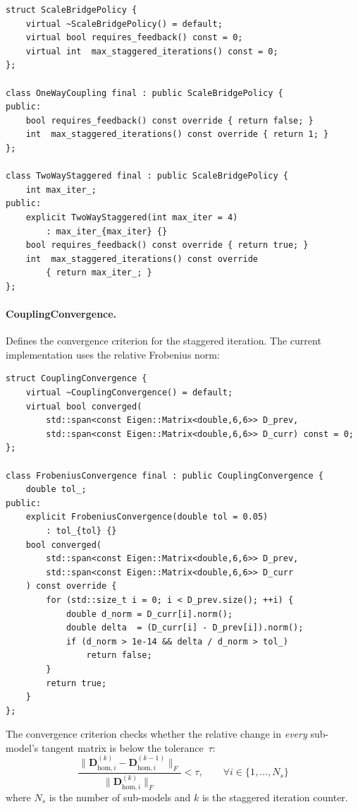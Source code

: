 \begin{lstlisting}[caption={Scale bridge policy ABC and concrete implementations.},
                   label={lst:scale-bridge}]
struct ScaleBridgePolicy {
    virtual ~ScaleBridgePolicy() = default;
    virtual bool requires_feedback() const = 0;
    virtual int  max_staggered_iterations() const = 0;
};

class OneWayCoupling final : public ScaleBridgePolicy {
public:
    bool requires_feedback() const override { return false; }
    int  max_staggered_iterations() const override { return 1; }
};

class TwoWayStaggered final : public ScaleBridgePolicy {
    int max_iter_;
public:
    explicit TwoWayStaggered(int max_iter = 4)
        : max_iter_{max_iter} {}
    bool requires_feedback() const override { return true; }
    int  max_staggered_iterations() const override
        { return max_iter_; }
};
\end{lstlisting}

\paragraph{CouplingConvergence.}
Defines the convergence criterion for the staggered iteration.
The current implementation uses the relative Frobenius norm:

\begin{lstlisting}[caption={Frobenius convergence criterion.},
                   label={lst:frobenius-conv}]
struct CouplingConvergence {
    virtual ~CouplingConvergence() = default;
    virtual bool converged(
        std::span<const Eigen::Matrix<double,6,6>> D_prev,
        std::span<const Eigen::Matrix<double,6,6>> D_curr) const = 0;
};

class FrobeniusConvergence final : public CouplingConvergence {
    double tol_;
public:
    explicit FrobeniusConvergence(double tol = 0.05)
        : tol_{tol} {}
    bool converged(
        std::span<const Eigen::Matrix<double,6,6>> D_prev,
        std::span<const Eigen::Matrix<double,6,6>> D_curr
    ) const override {
        for (std::size_t i = 0; i < D_prev.size(); ++i) {
            double d_norm = D_curr[i].norm();
            double delta  = (D_curr[i] - D_prev[i]).norm();
            if (d_norm > 1e-14 && delta / d_norm > tol_)
                return false;
        }
        return true;
    }
};
\end{lstlisting}

The convergence criterion checks whether the relative change in \emph{every}
sub-model's tangent matrix is below the tolerance~$\tau$:
\begin{equation}
  \frac{\bigl\lVert \mathbf{D}_{\mathrm{hom},i}^{(k)}
        - \mathbf{D}_{\mathrm{hom},i}^{(k-1)} \bigr\rVert_F}
       {\bigl\lVert \mathbf{D}_{\mathrm{hom},i}^{(k)} \bigr\rVert_F}
  < \tau, \qquad \forall i \in \{1,\ldots,N_s\}
  \label{eq:frobenius-conv}
\end{equation}
where $N_s$ is the number of sub-models and $k$ is the staggered
iteration counter.

